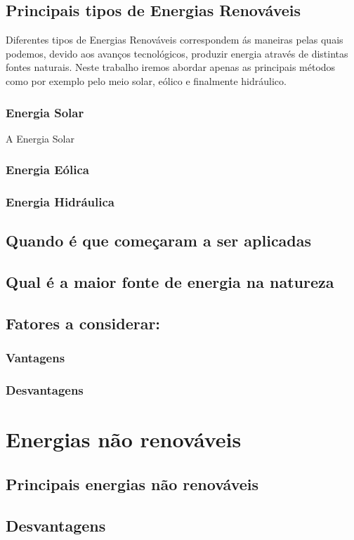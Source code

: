 \documentclass{report}
\begin{document}
\section{Principais tipos de Energias Renováveis}
Diferentes tipos de Energias Renováveis correspondem ás maneiras pelas quais podemos, devido aos avanços tecnológicos, produzir energia através de distintas fontes naturais. Neste trabalho iremos abordar apenas as principais métodos como por exemplo pelo meio solar, eólico e finalmente hidráulico.


\subsection{Energia Solar}
A Energia Solar 
\subsection{Energia Eólica}
\subsection{Energia Hidráulica}
\section{Quando é que começaram a ser aplicadas}
\section{Qual é a maior fonte de energia na natureza}
\section{Fatores a considerar:}
\subsection{Vantagens}
\subsection{Desvantagens}
\chapter{Energias não renováveis}
\section{Principais energias não renováveis}
\section{Desvantagens}
\end{document}

